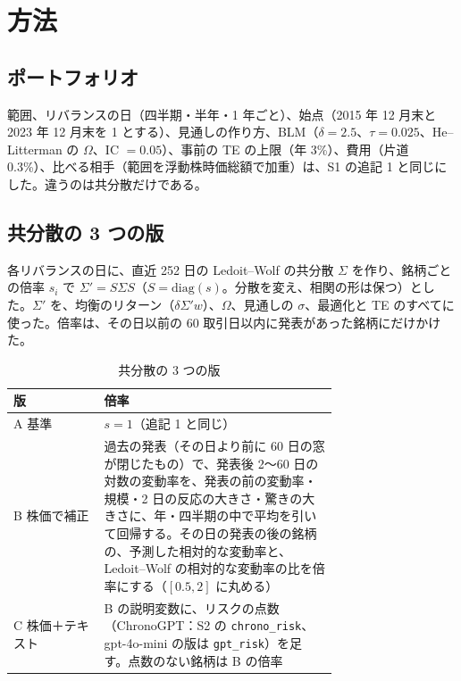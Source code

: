 \documentclass[xelatex,ja=standard,jafont=haranoaji,a4paper,10pt,openany]{bxjsreport}
\newcommand{\code}[1]{\texttt{#1}}
\begin{document}
\chapter{方法}\label{ch:method}

\section{ポートフォリオ}

範囲、リバランスの日（四半期・半年・1 年ごと）、始点（2015 年 12 月末と 2023 年 12 月末を 1 とする）、見通しの作り方、BLM（$\delta = 2.5$、$\tau = 0.025$、He--Litterman の $\Omega$、IC $= 0.05$）、事前の TE の上限（年 3\%）、費用（片道 0.3\%）、比べる相手（範囲を浮動株時価総額で加重）は、S1 の追記 1 と同じにした。違うのは共分散だけである。

\section{共分散の 3 つの版}

各リバランスの日に、直近 252 日の Ledoit--Wolf の共分散 $\Sigma$ を作り、銘柄ごとの倍率 $s_i$ で $\Sigma' = S\Sigma S$（$S = \mathrm{diag}(s)$。分散を変え、相関の形は保つ）とした。$\Sigma'$ を、均衡のリターン（$\delta\Sigma' w$）、$\Omega$、見通しの $\sigma$、最適化と TE のすべてに使った。倍率は、その日以前の 60 取引日以内に発表があった銘柄にだけかけた。

\begin{table}[H]
\centering\small
\caption{共分散の 3 つの版}
\label{tab:versions}
\begin{tabular}{@{}lp{0.72\linewidth}@{}}
\toprule
版 & 倍率 \\
\midrule
A 基準 & $s = 1$（追記 1 と同じ） \\
B 株価で補正 & 過去の発表（その日より前に 60 日の窓が閉じたもの）で、発表後 2〜60 日の対数の変動率を、発表の前の変動率・規模・2 日の反応の大きさ・驚きの大きさに、年・四半期の中で平均を引いて回帰する。その日の発表の後の銘柄の、予測した相対的な変動率と、Ledoit--Wolf の相対的な変動率の比を倍率にする（$[0.5, 2]$ に丸める） \\
C 株価＋テキスト & B の説明変数に、リスクの点数（ChronoGPT：S2 の \code{chrono\_risk}、gpt-4o-mini の版は \code{gpt\_risk}）を足す。点数のない銘柄は B の倍率 \\
\bottomrule
\end{tabular}
\end{table}
\end{document}
